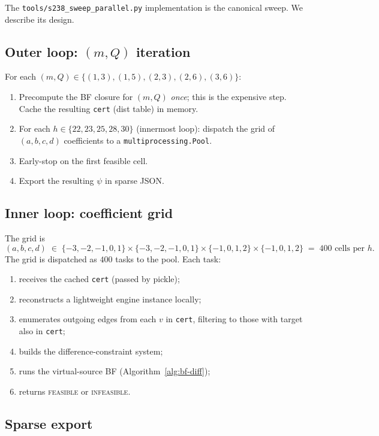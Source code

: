 \documentclass[11pt,a4paper]{article}
\theoremstyle{plain}
\theoremstyle{definition}
\begin{document}
The \texttt{tools/s238\_sweep\_parallel.py} implementation is the
canonical sweep. We describe its design.

\subsection*{Outer loop: $(m, Q)$ iteration}

For each $(m, Q) \in \{(1, 3), (1, 5), (2, 3), (2, 6), (3, 6)\}$:
\begin{enumerate}
  \item Precompute the BF closure for $(m, Q)$ \emph{once}; this is
        the expensive step. Cache the resulting \texttt{cert} (dist
        table) in memory.
  \item For each $h \in \{22, 23, 25, 28, 30\}$ (innermost loop):
        dispatch the grid of $(a, b, c, d)$ coefficients to a
        \texttt{multiprocessing.Pool}.
  \item Early-stop on the first feasible cell.
  \item Export the resulting $\psi$ in sparse JSON.
\end{enumerate}

\subsection*{Inner loop: coefficient grid}

The grid is
\[
   (a, b, c, d) \;\in\; \{-3, -2, -1, 0, 1\} \times \{-3, -2, -1, 0, 1\}
                       \times \{-1, 0, 1, 2\} \times \{-1, 0, 1, 2\}
   \;=\; 400 \text{ cells per } h.
\]
The grid is dispatched as $400$ tasks to the pool. Each task:
\begin{enumerate}
   \item receives the cached \texttt{cert} (passed by pickle);
   \item reconstructs a lightweight engine instance locally;
   \item enumerates outgoing edges from each $v$ in
         \texttt{cert}, filtering to those with target also in
         \texttt{cert};
   \item builds the difference-constraint system;
   \item runs the virtual-source BF
         (Algorithm~\ref{alg:bf-diff});
   \item returns \textsc{feasible} or \textsc{infeasible}.
\end{enumerate}

\subsection*{Sparse export}
\end{document}
